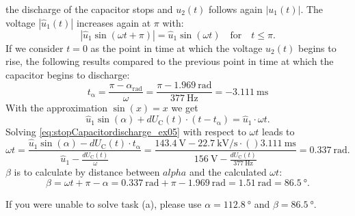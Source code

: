 \begin{solutionblock}
    the discharge of the capacitor stops and $u_\mathrm{2}(t)$ follows again $\left| u_\mathrm{1}(t) \right|$.
    The voltage $\left| \hat{u}_\mathrm{1}(t) \right|$ increases again at $\pi$ with:
    \begin{equation}
        \left| \hat{u}_\mathrm{1}\sin(\omega t + \pi ) \right| = \hat{u}_\mathrm{1}\sin(\omega t) \quad \text{for} \quad t \leq \pi.
    \end{equation}
    If we consider $t=0$ as the point in time at which the voltage $u_\mathrm{2}(t)$ begins to rise, the following 
    results compared to the previous point in time at which the capacitor begins to discharge:      
    \begin{equation}
        t_\mathrm{\alpha}=\frac{\pi - \alpha_\mathrm{rad}}{\omega} = 
        \frac{\pi - \SI{1.969}{\radian}}{\SI{377}{\hertz}} = \SI{-3.111}{\milli\second}
    \end{equation}   
    With the approximation $\sin(x) = x$ we get
    \begin{equation}
        \hat{u}_\mathrm{1}\sin(\alpha) + dU_\mathrm{C}(t) \cdot (t-t_\mathrm{\alpha}) = \hat{u}_\mathrm{1}\cdot \omega t.
        \label{eq:stopCapacitordischarge_ex05}
    \end{equation}   
    Solving \eqref{eq:stopCapacitordischarge_ex05} with respect to $\omega t$ leads to
    \begin{equation}
        \omega t = \frac{\hat{u}_\mathrm{1}\sin(\alpha) - dU_\mathrm{C}(t) \cdot t_\mathrm{\alpha}}
                   {\hat{u}_\mathrm{1}-\frac{dU_\mathrm{C}(t)}{\omega}}=
                   \frac{\SI{143.4}{\volt} - \SI{22.7}{\kilo\volt/\second} \cdot ()\SI{3.111}{\milli\second}}
                   {\SI{156}{\volt}-\frac{dU_\mathrm{C}(t)}{\SI{377}{\hertz}}}=\SI{0.337}{\radian}.
    \end{equation}
    $\beta$ is to calculate by distance between $alpha$ and the calculated $\omega t$:
    \begin{equation}
        \beta=\omega t + \pi - \alpha = \SI{0.337}{\radian} + \pi - \SI{1.969}{\radian}
        = \SI{1.51}{\radian} = \SI{86.5}{\degree}.
    \end{equation}
\end{solutionblock}

\vspace{2em}\par
If you were unable to solve task (a), please use $\alpha=\SI{112.8}{\degree}$ and $\beta=\SI{86.5}{\degree}$.

